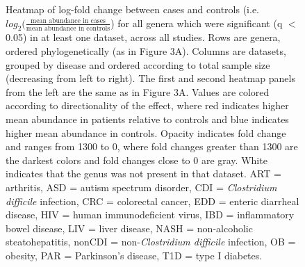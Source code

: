 \newpage
\begin{figure}[h]
	\begin{center}
    \captionsetup{font=footnotesize,labelfont=footnotesize}
	\caption{Heatmap of log-fold change between cases and controls (i.e. $log_2(\frac{\text{mean abundance in cases}}{\text{mean abundance in controls}}$) for all genera which were significant (q $<$ 0.05) in at least one dataset, across all studies. Rows are genera, ordered phylogenetically (as in Figure 3A). Columns are datasets, grouped by disease and ordered according to total sample size (decreasing from left to right). The first and second heatmap panels from the left are the same as in Figure 3A. Values are colored according to directionality of the effect, where red indicates higher mean abundance in patients relative to controls and blue indicates higher mean abundance in controls. Opacity indicates fold change and ranges from 1300 to 0, where fold changes greater than 1300 are the darkest colors and fold changes close to 0 are gray. White indicates that the genus was not present in that dataset. ART = arthritis, ASD = autism spectrum disorder, CDI = \textit{Clostridium difficile} infection, CRC = colorectal cancer, EDD = enteric diarrheal disease, HIV = human immunodeficient virus, IBD = inflammatory bowel disease, LIV = liver disease, NASH = non-alcoholic steatohepatitis, nonCDI = non-\textit{Clostridium difficile} infection, OB = obesity, PAR = Parkinson's disease, T1D = type I diabetes.
}
	\label{fig:overall_heatmap_foldchange}
	\end{center}
\end{figure}




